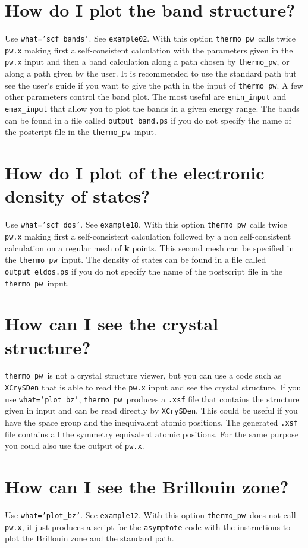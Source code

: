 \documentclass[12pt,a4paper]{article}
\def\thermo{\texttt{thermo\_pw}}
\begin{document}
\section{\color{coral}How do I plot the band structure?}
Use \texttt{what='scf\_bands'}. See \texttt{example02}.
With this option \thermo\ calls twice
\texttt{pw.x} making first a self-consistent calculation with the parameters
given in the \texttt{pw.x} input and then a band calculation along a 
path chosen by \thermo, or along a path given by the user. It is recommended
to use the standard path but see the user's guide if you want to give
the path in the input of \thermo. 
A few other parameters control the band plot. The most useful are 
\texttt{emin\_input} and \texttt{emax\_input} that allow you to plot the 
bands in a given energy range. The bands can be found 
in a file called \texttt{output\_band.ps} if you do not specify the name 
of the postcript file in the \thermo\ input.

\section{\color{coral}How do I plot of the electronic density of states?}
Use \texttt{what='scf\_dos'}. See \texttt{example18}. With this option
\thermo\ calls twice \texttt{pw.x} making first a self-consistent calculation
followed by a non self-consistent calculation on a regular mesh of 
{\bf k} points.
This second mesh can be specified in the \thermo\ input. The density of
states can be found in a file called \texttt{output\_eldos.ps} if you do not
specify the name of the postscript file in the \thermo\ input.

\section{\color{coral}How can I see the crystal structure?}
\thermo\ is not a crystal structure viewer, but you can use a code such
as \texttt{XCrySDen} that is able to read the \texttt{pw.x} input and
see the crystal structure. If you use \texttt{what='plot\_bz'}, 
\thermo\ produces a \texttt{.xsf} file that contains the structure given in
input and can be read directly by \texttt{XCrySDen}. This could
be useful if you have the space group and the inequivalent atomic positions.
The generated \texttt{.xsf} file contains all the symmetry equivalent 
atomic positions. For the same purpose you could also use the output
of \texttt{pw.x}.

\section{\color{coral}How can I see the Brillouin zone?}
Use \texttt{what='plot\_bz'}. See \texttt{example12}. With this option
\thermo\ does not call \texttt{pw.x}, it just produces a script for
the \texttt{asymptote} code with the instructions to plot the Brillouin
zone and the standard path.
\end{document}
